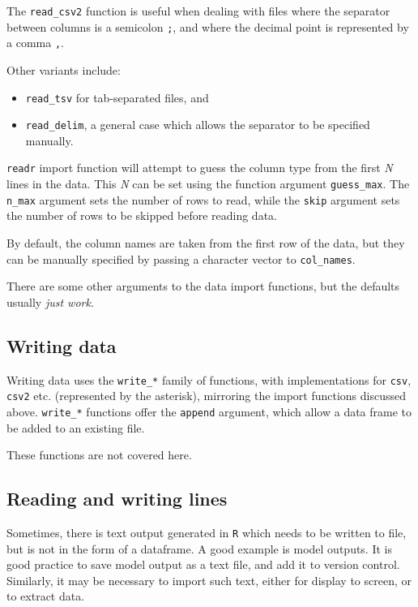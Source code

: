 \documentclass[]{book}
\begin{document}
The \texttt{read\_csv2} function is useful when dealing with files where the separator between columns is a semicolon \texttt{;}, and where the decimal point is represented by a comma \texttt{,}.

Other variants include:

\begin{itemize}
\item
  \texttt{read\_tsv} for tab-separated files, and
\item
  \texttt{read\_delim}, a general case which allows the separator to be specified manually.
\end{itemize}

\texttt{readr} import function will attempt to guess the column type from the first \emph{N} lines in the data. This \emph{N} can be set using the function argument \texttt{guess\_max}. The \texttt{n\_max} argument sets the number of rows to read, while the \texttt{skip} argument sets the number of rows to be skipped before reading data.

By default, the column names are taken from the first row of the data, but they can be manually specified by passing a character vector to \texttt{col\_names}.

There are some other arguments to the data import functions, but the defaults usually \emph{just work}.

\hypertarget{writing-data}{%
\subsection{Writing data}\label{writing-data}}

Writing data uses the \texttt{write\_*} family of functions, with implementations for \texttt{csv}, \texttt{csv2} etc. (represented by the asterisk), mirroring the import functions discussed above. \texttt{write\_*} functions offer the \texttt{append} argument, which allow a data frame to be added to an existing file.

These functions are not covered here.

\hypertarget{reading-and-writing-lines}{%
\subsection{Reading and writing lines}\label{reading-and-writing-lines}}

Sometimes, there is text output generated in \texttt{R} which needs to be written to file, but is not in the form of a dataframe. A good example is model outputs. It is good practice to save model output as a text file, and add it to version control.
Similarly, it may be necessary to import such text, either for display to screen, or to extract data.
\end{document}
